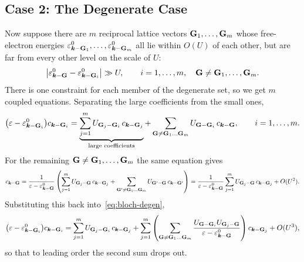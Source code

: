 \subsection{Case 2: The Degenerate Case}

Now suppose there are $m$ reciprocal lattice vectors $\cvect{G}_1,\ldots,\cvect{G}_m$ whose free-electron energies $\varepsilon^0_{\lvect{k}-\cvect{G}_1},\ldots,\varepsilon^0_{\lvect{k}-\cvect{G}_m}$ all lie within $O(U)$ of each other, but are far from every other level on the scale of $U$:
\begin{equation}
    \bigl|\varepsilon^0_{\lvect{k}-\cvect{G}} - \varepsilon^0_{\lvect{k}-\cvect{G}_i}\bigr| \gg U,
    \qquad i = 1,\ldots,m, \quad \cvect{G} \neq \cvect{G}_1,\ldots,\cvect{G}_m.
\end{equation}
There is one constraint for each member of the degenerate set, so we get $m$ coupled equations. Separating the large coefficients from the small ones,
\begin{equation}
    \bigl(\varepsilon - \varepsilon^0_{\lvect{k}-\cvect{G}_i}\bigr) c_{\lvect{k}-\cvect{G}_i}
    = \underbrace{\sum_{j=1}^{m} U_{\cvect{G}_j-\cvect{G}_i}\, c_{\lvect{k}-\cvect{G}_j}}_{\text{large coefficients}}
    + \sum_{\cvect{G} \neq \cvect{G}_1\ldots\cvect{G}_m} U_{\cvect{G}-\cvect{G}_i}\, c_{\lvect{k}-\cvect{G}},
    \qquad i = 1,\ldots,m.
    \label{eq:bloch-degen}
\end{equation}
For the remaining $\cvect{G} \neq \cvect{G}_1,\ldots,\cvect{G}_m$ the same equation gives
\begin{equation}
    c_{\lvect{k}-\cvect{G}} = \frac{1}{\varepsilon - \varepsilon^0_{\lvect{k}-\cvect{G}}}
    \left( \sum_{j=1}^{m} U_{\cvect{G}_j-\cvect{G}}\, c_{\lvect{k}-\cvect{G}_j}
    + \sum_{\cvect{G}' \neq \cvect{G}_1\ldots\cvect{G}_m} U_{\cvect{G}'-\cvect{G}}\, c_{\lvect{k}-\cvect{G}'} \right)
    = \frac{1}{\varepsilon - \varepsilon^0_{\lvect{k}-\cvect{G}}} \sum_{j=1}^{m} U_{\cvect{G}_j-\cvect{G}}\, c_{\lvect{k}-\cvect{G}_j} + O(U^2).
\end{equation}
Substituting this back into~\eqref{eq:bloch-degen},
\begin{equation}
    \bigl(\varepsilon - \varepsilon^0_{\lvect{k}-\cvect{G}_i}\bigr) c_{\lvect{k}-\cvect{G}_i}
    = \sum_{j=1}^{m} U_{\cvect{G}_j-\cvect{G}_i}\, c_{\lvect{k}-\cvect{G}_j}
    + \sum_{j=1}^{m} \left( \sum_{\cvect{G} \neq \cvect{G}_1\ldots\cvect{G}_m}
    \frac{U_{\cvect{G}-\cvect{G}_i} U_{\cvect{G}_j-\cvect{G}}}{\varepsilon - \varepsilon^0_{\lvect{k}-\cvect{G}}} \right) c_{\lvect{k}-\cvect{G}_j} + O(U^3),
\end{equation}
so that to leading order the second sum drops out.

